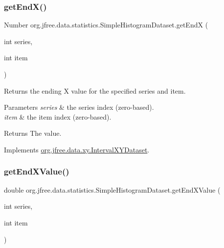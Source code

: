 \subsubsection{\texorpdfstring{get\+End\+X()}{getEndX()}}
{\footnotesize\ttfamily Number org.\+jfree.\+data.\+statistics.\+Simple\+Histogram\+Dataset.\+get\+EndX (\begin{DoxyParamCaption}\item[{int}]{series,  }\item[{int}]{item }\end{DoxyParamCaption})}

Returns the ending X value for the specified series and item.


\begin{DoxyParams}{Parameters}
{\em series} & the series index (zero-\/based). \\
\hline
{\em item} & the item index (zero-\/based).\\
\hline
\end{DoxyParams}
\begin{DoxyReturn}{Returns}
The value. 
\end{DoxyReturn}


Implements \mbox{\hyperlink{interfaceorg_1_1jfree_1_1data_1_1xy_1_1_interval_x_y_dataset_a93161a6d6c1db37cfac030239c62ab0a}{org.\+jfree.\+data.\+xy.\+Interval\+X\+Y\+Dataset}}.

\mbox{\label{classorg_1_1jfree_1_1data_1_1statistics_1_1_simple_histogram_dataset_acad8234cbd7d6fa06c8202e807c066a7}} 
\subsubsection{\texorpdfstring{get\+End\+X\+Value()}{getEndXValue()}}
{\footnotesize\ttfamily double org.\+jfree.\+data.\+statistics.\+Simple\+Histogram\+Dataset.\+get\+End\+X\+Value (\begin{DoxyParamCaption}\item[{int}]{series,  }\item[{int}]{item }\end{DoxyParamCaption})}

